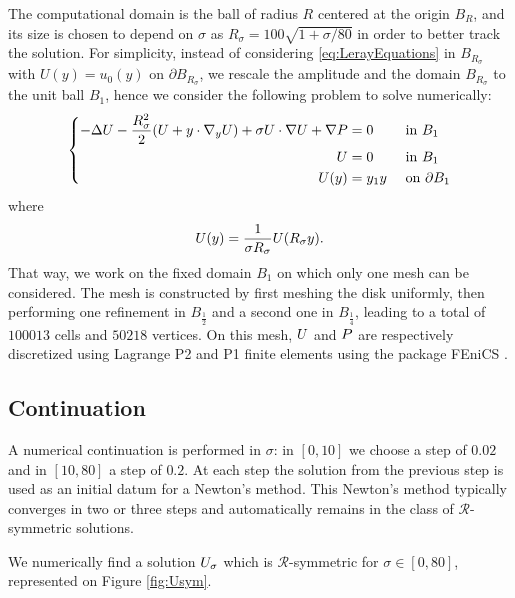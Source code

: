 \documentclass[12pt,reqno]{amsart}
\theoremstyle{plain}
\theoremstyle{definition}
\renewcommand{\:}{\colon}
\let\div\relax
\DeclareMathOperator{\div}{div}
\let\tilde\relax
\newcommand{\tilde}[1]{\widetilde{#1}}
\numberwithin{equation}{section}
\numberwithin{figure}{section}
\begin{document}
The computational domain is the ball of radius $R$ centered at the origin $B_{R}$, and its size is chosen to depend on $\sigma$ as $R_{\sigma}=100\sqrt{1+\sigma/80}$ in order to better track the solution.
For simplicity, instead of
considering \eqref{eq:LerayEquations} in $B_{R_{\sigma}}$ with $U(y)=u_{0}(y)$
on $\partial B_{R_{\sigma}}$, we rescale the amplitude and the domain
$B_{R_{\sigma}}$ to the unit ball $B_1$, hence we consider the
following problem to solve numerically:
\begin{equation}
	\label{eq:LerayEquationsBall}
	\left\{ \begin{aligned}-\Delta\tilde{U}-\frac{R_{\sigma}^{2}}{2}(\tilde{U}+\tilde{y}\cdot\nabla_{\tilde{y}}\tilde{U})+\sigma\tilde{U}\cdot\nabla\tilde{U}+\nabla\tilde{P} & =0 &  & \text{ in }B_1\\
		\div\tilde{U} & =0 &  & \text{ in }B_1\\
		\tilde{U}(\tilde{y}) & =\tilde{y}_{1}\tilde{y} &  & \text{ on }\partial B_1
	\end{aligned}
	\right.
\end{equation}
where
\begin{equation}
	\tilde{U}(\tilde{y})=\frac{1}{\sigma R_{\sigma}}U(R_{\sigma}\tilde{y}).
\end{equation}
That way, we work on the fixed domain $B_1$ on which only one mesh can be considered. The mesh is constructed by first meshing the disk uniformly,
then performing one refinement in $B_{\frac{1}{2}}$ and a second one in $B_{\frac{1}{4}}$, leading to a total of $100013$ cells and $50218$ vertices.
On this mesh, $\tilde{U}$ and $\tilde{P}$ are respectively discretized
using Lagrange P2 and P1 finite elements using the package FEniCS \cite{Logg-FENICS2012,Alnes-FENICS2015}.

\subsection{Continuation}

A numerical continuation is performed in $\sigma$: in $[0,10]$ we
choose a step of $0.02$ and in $[10,80]$ a step of $0.2$. At each
step the solution from the previous step is used as an initial datum
for a Newton's method. This Newton's method typically converges in
two or three steps and automatically remains in the class of $\mathcal{R}$-symmetric solutions.

We numerically find a solution $\tilde{U}_{\sigma}$ which is $\mathcal{R}$-symmetric
for $\sigma\in[0,80]$, represented on Figure \ref{fig:Usym}.
\end{document}
